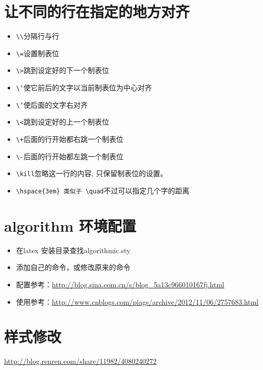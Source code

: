 \documentclass[UTF8,a4paper,8pt]{ctexart}
\begin{document}
\section{让不同的行在指定的地方对齐}
	   \begin{itemize}
		   	\item \verb|\\|分隔行与行
		   	\item  \verb|\=|设置制表位
		   	\item  \verb|\>|跳到设定好的下一个制表位
		   	\item  \verb|\‘|使它前后的文字以当前制表位为中心对齐
		   	\item  \verb|\’|使后面的文字右对齐
		   	\item  \verb|\<|跳到设定好的上一个制表位
		   	\item  \verb|\+|后面的行开始都右跳一个制表位
		   	\item  \verb|\-|后面的行开始都左跳一个制表位
		   	\item  \verb|\kill|忽略这一行的内容, 只保留制表位的设置。		   			   	
		   	\item  \verb|\hspace{3em} 类似于 \quad|不过可以指定几个字的距离
	   \end{itemize}
 	
	 	
\section{algorithm 环境配置}
		\begin{itemize}
			\item  在latex 安装目录查找algorithmic.sty
			\item  添加自己的命令，或修改原来的命令
			
			\item  配置参考：\url{http://blog.sina.com.cn/s/blog\_5a13c966010167fj.html}
			\item  使用参考：\url{http://www.cnblogs.com/piags/archive/2012/11/06/2757683.html}
		\end{itemize}	

\section{样式修改}
		\url{http://blog.renren.com/share/11982/4080240272}     
\end{document}

